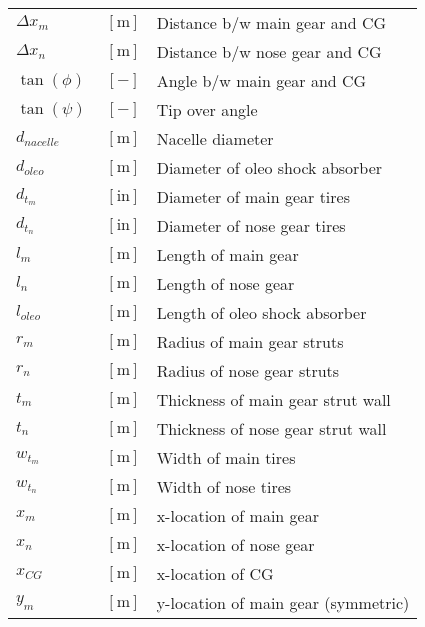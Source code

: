 {\begin{supertabular}{lcl}
$\Delta x_m$ & $~\mathrm{[m]}$ & Distance b/w main gear and CG \\
$\Delta x_n$ & $~\mathrm{[m]}$ & Distance b/w nose gear and CG \\
$\tan(\phi)$ & $~[-]$ & Angle b/w main gear and CG \\
$\tan(\psi)$ & $~[-]$ & Tip over angle \\
$d_{nacelle}$ & $~\mathrm{[m]}$ & Nacelle diameter \\
$d_{oleo}$ & $~\mathrm{[m]}$ & Diameter of oleo shock absorber \\
$d_{t_m}$ & $~\mathrm{[in]}$ & Diameter of main gear tires \\
$d_{t_n}$ & $~\mathrm{[in]}$ & Diameter of nose gear tires \\
$l_m$ & $~\mathrm{[m]}$ & Length of main gear \\
$l_n$ & $~\mathrm{[m]}$ & Length of nose gear \\
$l_{oleo}$ & $~\mathrm{[m]}$ & Length of oleo shock absorber \\
$r_m$ & $~\mathrm{[m]}$ & Radius of main gear struts \\
$r_n$ & $~\mathrm{[m]}$ & Radius of nose gear struts \\
$t_m$ & $~\mathrm{[m]}$ & Thickness of main gear strut wall \\
$t_n$ & $~\mathrm{[m]}$ & Thickness of nose gear strut wall \\
$w_{t_m}$ & $~\mathrm{[m]}$ & Width of main tires \\
$w_{t_n}$ & $~\mathrm{[m]}$ & Width of nose tires \\
$x_m$ & $~\mathrm{[m]}$ & x-location of main gear \\
$x_n$ & $~\mathrm{[m]}$ & x-location of nose gear \\
$x_{CG}$ & $~\mathrm{[m]}$ & x-location of CG \\
$y_m$ & $~\mathrm{[m]}$ & y-location of main gear (symmetric) \\
\bottomrule
\end{supertabular}}

% 